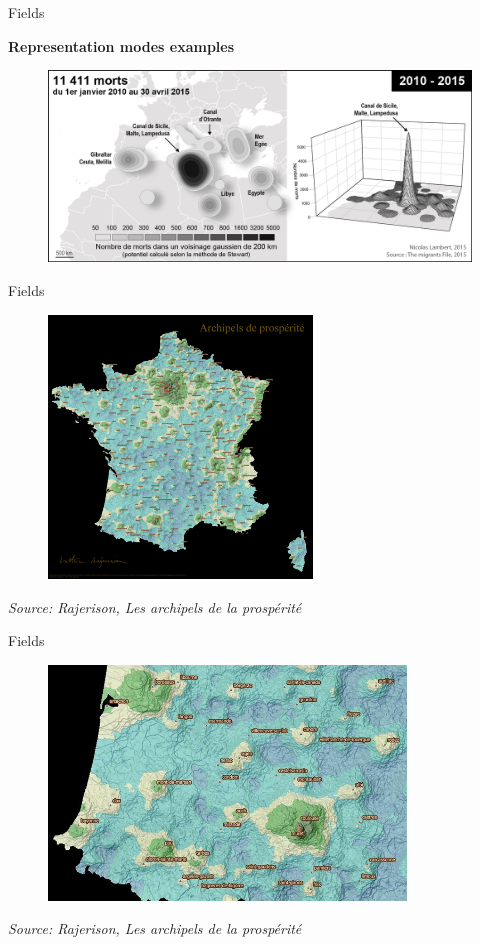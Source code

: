 \begin{frame}{Fields}

\textbf{Representation modes examples}

\begin{figure}
\includegraphics[width=11.5cm]{Migrants4.png}
\end{figure}

\end{frame}


\begin{frame}{Fields}

\begin{figure}
\includegraphics[width=7cm]{Rajerison_Revenu.jpg}
\end{figure}

\footnotesize
\textit{Source: Rajerison, Les archipels de la prospérité}
\normalsize

\end{frame}



\begin{frame}{Fields}

\begin{figure}
\includegraphics[width=9.5cm]{Rajerison_Zoom.jpg}
\end{figure}

\footnotesize
\textit{Source: Rajerison, Les archipels de la prospérité}
\normalsize

\end{frame}
